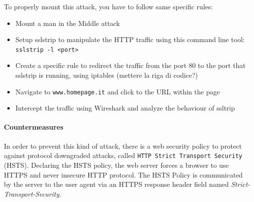\documentclass{article}
\begin{document}
To properly mount this attack, you have to follow same specific rules:
\begin{itemize}
  \item Mount a man in the Middle attack
  \item Setup sslstrip to manipulate the HTTP traffic using this command line tool: \texttt{sslstrip -l <port>}
  \item Create a specific rule to redirect the traffic from the port 80 to the port that sslstrip is running, using iptables (mettere la riga di codice?)
  \item Navigate to \texttt{www.homepage.it} and click to the URL within the page
  \item Intercept the traffic using Wireshark and analyze the behaviour of ssltrip
\end{itemize}
\paragraph{Countermeasures}
In order to prevent this kind of attack, there is a web security policy to protect against protocol downgraded attacks, called \texttt{HTTP Strict Transport Security} (HSTS). Declaring the HSTS policy, the web server forces a browser to use HTTPS and never insecure HTTP protocol. The HSTS Policy is communicated by the server to the user agent via an HTTPS response header field named \textit{Strict-Transport-Security}.
\end{document}
